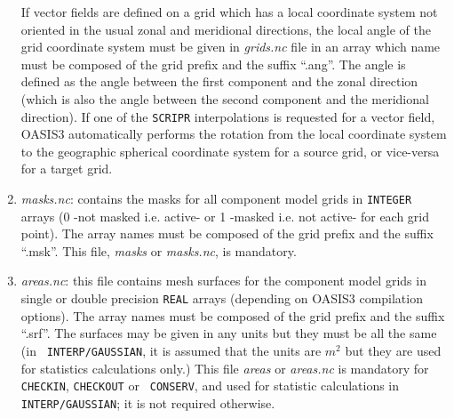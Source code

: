 \begin{enumerate}
 If vector fields are defined on a grid which has a local coordinate
 system not oriented in the usual zonal and meridional directions, the
 local angle of the grid coordinate system must be given in {\it
   grids.nc} file in an array which name must be composed of the grid
 prefix and the suffix ``.ang''. The angle is defined as the angle
 between the first component and the zonal direction (which is also
 the angle between the second component and the meridional direction).
 If one of the {\tt SCRIPR} interpolations is requested for a vector
 field, OASIS3 automatically performs the rotation from the local
 coordinate system to the geographic spherical coordinate system for a
 source grid, or vice-versa for a target grid.
 
\item {\em masks.nc}: contains the masks for all
  component model grids in {\tt INTEGER} arrays (0 -not masked i.e.
  active- or 1 -masked i.e. not active- for each grid point). The
  array names must be composed of the grid prefix and the suffix
  ``.msk''. This file, {\em masks} or {\em masks.nc}, is mandatory.

\item {\em areas.nc}: this file contains mesh surfaces
for the component model grids in single or double precision {\tt REAL}
arrays (depending on OASIS3 compilation options). The array names must be
composed of the grid prefix and the suffix ``.srf''.  The surfaces may
be given in any units but they must be all the same (in {\tt
INTERP/GAUSSIAN}, it is assumed that the units are $m^2$ but they are
used for statistics calculations only.) This file {\em areas} or {\em
areas.nc} is mandatory for {\tt CHECKIN}, {\tt CHECKOUT} or {\tt
CONSERV}, and used for statistic calculations in {\tt
INTERP/GAUSSIAN}; it is not required otherwise.

  
\end{enumerate}

